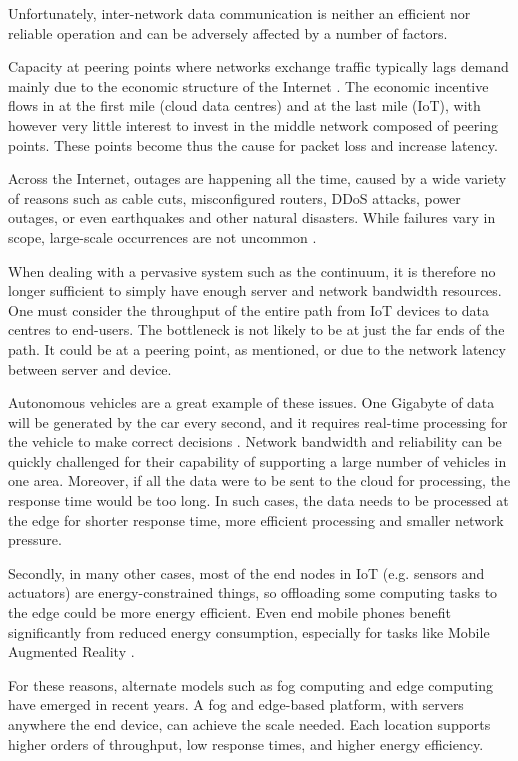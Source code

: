 \documentclass{ieeeaccess}
\begin{document}
Unfortunately, inter-network data communication is neither an efficient nor reliable operation and can be adversely affected by a number of factors.

Capacity at peering points where networks exchange traffic typically lags demand mainly due to the economic structure of the Internet \cite{akamai}. The economic incentive flows in at the first mile (cloud data centres) and at the last mile (IoT), with however very little interest to invest in the middle network composed of peering points. These points become thus the cause for packet loss and increase latency.

Across the Internet, outages are happening all the time, caused by a wide variety of reasons such as cable cuts, misconfigured routers, DDoS attacks, power outages, or even earthquakes and other natural disasters. While failures vary in scope, large-scale occurrences are not uncommon \cite{aws-outage}.

When dealing with a pervasive system such as the continuum, it is therefore no longer sufficient to simply have enough server and network bandwidth resources. One must consider the throughput of the entire path from IoT devices to data centres to end-users. The bottleneck is not likely to be at just the far ends of the path. It could be at a peering point, as mentioned, or due to the network latency between server and device. 

Autonomous vehicles are a great example of these issues. One Gigabyte of data will be generated by the car every second, and it requires real-time processing for the vehicle to make correct decisions \cite{edge-computing-vision-challenges}. Network bandwidth and reliability can be quickly challenged for their capability of supporting a large number of vehicles in one area. Moreover, if all the data were to be sent to the cloud for processing, the response time would be too long. In such cases, the data needs to be processed at the edge for shorter response time, more efficient processing and smaller network pressure.

Secondly, in many other cases, most of the end nodes in IoT (e.g. sensors and actuators) are energy-constrained things, so offloading some computing tasks to the edge could be more energy efficient. Even end mobile phones benefit significantly from reduced energy consumption, especially for tasks like Mobile Augmented Reality \cite{mobile-augmented-reality}.

For these reasons, alternate models such as fog computing and edge computing have emerged in recent years. A fog and edge-based platform, with servers anywhere the end device, can achieve the scale needed. Each location supports higher orders of throughput, low response times, and higher energy efficiency.
\end{document}
